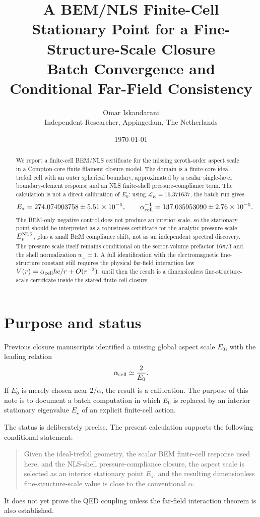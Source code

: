 \documentclass[11pt]{article}
\title{A BEM/NLS Finite-Cell Stationary Point for a Fine-Structure-Scale Closure\\
\large Batch Convergence and Conditional Far-Field Consistency}
\author{Omar Iskandarani\\\small Independent Researcher, Appingedam, The Netherlands}
\date{\today}
\newcommand{\Estar}{E_\star}
\newcommand{\alphacell}{\alpha_{\rm cell}}
\begin{document}
\maketitle

\begin{abstract}
We report a finite-cell BEM/NLS certificate for the missing zeroth-order aspect
scale in a Compton-core finite-filament closure model.  The domain is a
finite-core ideal trefoil cell with an outer spherical boundary, approximated
by a scalar single-layer boundary-element response and an NLS finite-shell
pressure-compliance term.  The calculation is not a direct calibration of
\(E_0\): using \(\mathcal L_K=16.371637\), the batch run gives
\[
  E_\star=274.074903758\pm5.51\times10^{-5},
  \qquad
  \alpha_{\rm cell}^{-1}=137.035953090\pm2.76\times10^{-5}.
\]
The BEM-only negative control does not produce an interior scale, so the
stationary point should be interpreted as a robustness certificate for the
analytic pressure scale \(E_p^{\rm NLS}\), plus a small BEM compliance shift,
not as an independent spectral discovery.  The pressure scale itself remains
conditional on the sector-volume prefactor \(16\pi/3\) and the shell
normalization \(w_\perp=1\).  A full identification with the electromagnetic
fine-structure constant still requires the physical far-field interaction law
\(V(r)=\alpha_{\rm cell}\hbar c/r+O(r^{-2})\); until then the result is a
dimensionless fine-structure-scale certificate inside the stated finite-cell
closure.
\end{abstract}

\section{Purpose and status}

Previous closure manuscripts identified a missing global aspect scale \(E_0\), with the leading relation
\[
\alphacell \simeq \frac{2}{E_0}.
\]
If \(E_0\) is merely chosen near \(2/\alpha\), the result is a calibration. The purpose of this note is to document a batch computation in which \(E_0\) is replaced by an interior stationary eigenvalue \(\Estar\) of an explicit finite-cell action.

The status is deliberately precise. The present calculation supports the following conditional statement:
\begin{quote}
Given the ideal-trefoil geometry, the scalar BEM finite-cell response used here, and the NLS-shell pressure-compliance closure, the aspect scale is selected as an interior stationary point \(\Estar\), and the resulting dimensionless fine-structure-scale value is close to the conventional \(\alpha\).
\end{quote}
It does not yet prove the QED coupling unless the far-field interaction theorem is also established.
\end{document}
